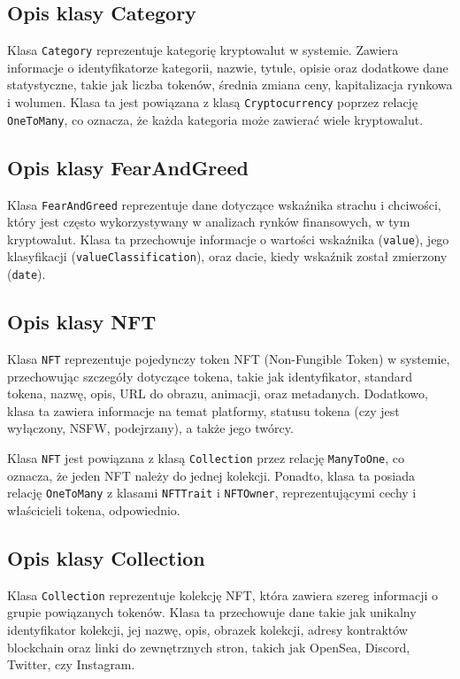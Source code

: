 \subsection{Opis klasy Category}

Klasa \texttt{Category} reprezentuje kategorię kryptowalut w systemie. Zawiera informacje o identyfikatorze kategorii, nazwie, tytule, opisie oraz dodatkowe dane statystyczne, takie jak liczba tokenów, średnia zmiana ceny, kapitalizacja rynkowa i wolumen. Klasa ta jest powiązana z klasą \texttt{Cryptocurrency} poprzez relację \texttt{OneToMany}, co oznacza, że każda kategoria może zawierać wiele kryptowalut. 

\subsection{Opis klasy FearAndGreed}

Klasa \texttt{FearAndGreed} reprezentuje dane dotyczące wskaźnika strachu i chciwości, który jest często wykorzystywany w analizach rynków finansowych, w tym kryptowalut. Klasa ta przechowuje informacje o wartości wskaźnika (\texttt{value}), jego klasyfikacji (\texttt{valueClassification}), oraz dacie, kiedy wskaźnik został zmierzony (\texttt{date}).

\subsection{Opis klasy NFT}

Klasa \texttt{NFT} reprezentuje pojedynczy token NFT (Non-Fungible Token) w systemie, przechowując szczegóły dotyczące tokena, takie jak identyfikator, standard tokena, nazwę, opis, URL do obrazu, animacji, oraz metadanych. Dodatkowo, klasa ta zawiera informacje na temat platformy, statusu tokena (czy jest wyłączony, NSFW, podejrzany), a także jego twórcy.

Klasa \texttt{NFT} jest powiązana z klasą \texttt{Collection} przez relację \texttt{ManyToOne}, co oznacza, że jeden NFT należy do jednej kolekcji. Ponadto, klasa ta posiada relację \texttt{OneToMany} z klasami \texttt{NFTTrait} i \texttt{NFTOwner}, reprezentującymi cechy i właścicieli tokena, odpowiednio. 

\subsection{Opis klasy Collection}

Klasa \texttt{Collection} reprezentuje kolekcję NFT, która zawiera szereg informacji o grupie powiązanych tokenów. Klasa ta przechowuje dane takie jak unikalny identyfikator kolekcji, jej nazwę, opis, obrazek kolekcji, adresy kontraktów blockchain oraz linki do zewnętrznych stron, takich jak OpenSea, Discord, Twitter, czy Instagram.


